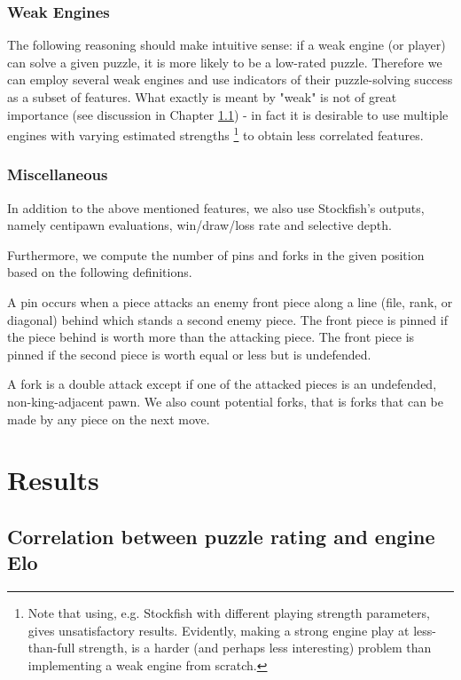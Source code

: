 \documentclass[sigconf,nonacm]{acmart}
\begin{document}
\subsubsection{Weak Engines}

The following reasoning should make intuitive sense: if a weak engine (or player) can solve a given puzzle, it is more likely to be a low-rated puzzle. Therefore we can employ several weak engines and use indicators of their puzzle-solving success as a subset of features. What exactly is meant by "weak" is not of great importance (see discussion in Chapter \ref{elo_ch}) - in fact it is desirable to use multiple engines with varying estimated strengths \footnote{Note that using, e.g. Stockfish with different playing strength parameters, gives unsatisfactory results. Evidently, making a strong engine play at less-than-full strength, is a harder (and perhaps less interesting) problem than implementing a weak engine from scratch.} to obtain less correlated features. 

\subsubsection{Miscellaneous}

In addition to the above mentioned features, we also use Stockfish's outputs, namely centipawn evaluations, win/draw/loss rate and selective depth. 

Furthermore, we compute the number of pins and forks in the given position based on the following definitions.

A pin occurs when a piece attacks an enemy front piece along a line (file, rank, or diagonal) behind which stands a second enemy piece. The front piece is pinned if the piece behind is worth more than the attacking piece. The front piece is pinned if the second piece is worth equal or less but is undefended.


A fork is a double attack except if one of the attacked pieces is an undefended, non-king-adjacent pawn. We also count potential forks, that is forks that can be made by any piece on the next move. 

\section{Results}
\label{results}

\subsection{Correlation between puzzle rating and engine Elo}
\label{elo_ch}
\end{document}
